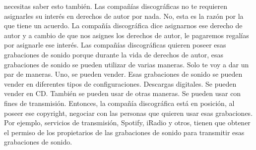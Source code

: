\documentclass[10pt]{book}
\begin{document}
necesitas saber esto también. Las compañías discográficas no te requieren asignarles su interés en derechos de autor por nada. No, esta es la razón por la que tiene un acuerdo. La compañía discográfica dice asignarnos ese derecho de autor y a cambio de que nos asignes los derechos de autor, le pagaremos regalías por asignarle ese interés. Las compañías discográficas quieren poseer esas grabaciones de sonido porque durante la vida de derechos de autor, esas grabaciones de sonido se pueden utilizar de varias maneras. Solo te voy a dar un par de maneras. Uno, se pueden vender. Esas grabaciones de sonido se pueden vender en diferentes tipos de configuraciones. Descargas digitales. Se pueden vender en CD. También se pueden usar de otras maneras. Se pueden usar con fines de transmisión. Entonces, la compañía discográfica está en posición, al poseer ese copyright, negociar con las personas que quieren usar esas grabaciones. Por ejemplo, servicios de transmisión, Spotify, iRadio y otros, tienen que obtener el permiso de los propietarios de las grabaciones de sonido para transmitir esas grabaciones de sonido. \\
\end{document}
